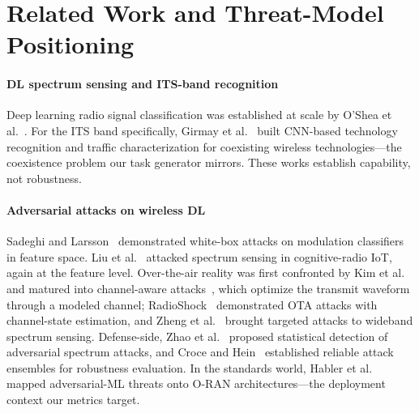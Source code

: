 \documentclass[review]{elsarticle}
\begin{document}
\section{Related Work and Threat-Model Positioning}
\label{sec:related}

\paragraph{DL spectrum sensing and ITS-band recognition} Deep learning radio
signal classification was established at scale by O'Shea et
al.~\cite{o2018}. For the ITS band specifically, Girmay et
al.~\cite{girmay2023} built CNN-based technology recognition and traffic
characterization for coexisting wireless technologies---the coexistence
problem our task generator mirrors. These works establish capability, not
robustness.

\paragraph{Adversarial attacks on wireless DL} Sadeghi and
Larsson~\cite{sadeghi2019} demonstrated white-box attacks on modulation
classifiers in feature space. Liu et al.~\cite{liu2022} attacked
spectrum sensing in cognitive-radio IoT, again at the feature level.
Over-the-air reality was first confronted by Kim et al.~\cite{kim2020} and
matured into channel-aware attacks~\cite{sagduyu2021}, which optimize the
transmit waveform through a modeled channel; RadioShock~\cite{radioshock2026}
demonstrated OTA attacks with channel-state estimation, and Zheng et
al.~\cite{zheng2026} brought targeted attacks to wideband spectrum sensing.
Defense-side, Zhao et al.~\cite{zhao2024} proposed statistical detection of
adversarial spectrum attacks, and Croce and Hein~\cite{croce2020} established
reliable attack ensembles for robustness evaluation. In the standards world,
Habler et al.~\cite{habler2025} mapped adversarial-ML threats onto O-RAN
architectures---the deployment context our metrics target.
\end{document}
